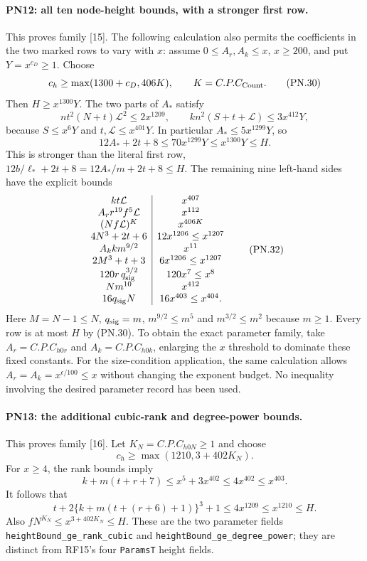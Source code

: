 \paragraph{PN12: all ten node-height bounds, with a stronger first row.}
This proves family [15]. The following calculation also permits the
coefficients in the two marked rows to vary with $x$: assume
$0\leq A_r,A_k\leq x$, $x\geq200$, and put $Y=x^{c_D}\geq1$.
Choose
\[
                  c_h\geq\max(1300+c_D,406K),
                  \qquad K=C.P.C_{\rm Count}.                \tag{PN.30}
\]
Then $H\geq x^{1300}Y$. The two parts of $A_*$ satisfy
\[
 nt^2(N+t)\mathcal L^2\leq2x^{1209},\qquad
 kn^2(S+t+\mathcal L)\leq3x^{412}Y,
\]
because $S\leq x^6Y$ and $t,\mathcal L\leq x^{401}Y$.
In particular $A_*\leq5x^{1299}Y$, so
\[
 12A_*+2t+8\leq70x^{1299}Y\leq x^{1300}Y\leq H.
                                                               \tag{PN.31}
\]
This is stronger than the literal first row,
$12b/\ell_*+2t+8=12A_*/m+2t+8\leq H$.
The remaining nine left-hand sides have the explicit bounds
\[
\begin{array}{c|c}
 kt\mathcal L&x^{407}\\
 A_r r^{19}f^5\mathcal L&x^{112}\\
 (Nf\mathcal L)^K&x^{406K}\\
 4N^3+2t+6&12x^{1206}\leq x^{1207}\\
 A_k k m^{9/2}&x^{11}\\
 2M^3+t+3&6x^{1206}\leq x^{1207}\\
 120r\,q_{\rm sig}^{3/2}&120x^7\leq x^8\\
 Nm^{10}&x^{412}\\
 16q_{\rm sig}N&16x^{403}\leq x^{404}.
\end{array}                                                   \tag{PN.32}
\]
Here $M=N-1\leq N$, $q_{\rm sig}=m$,
$m^{9/2}\leq m^5$ and $m^{3/2}\leq m^2$ because $m\geq1$.
Every row is at most $H$ by (PN.30). To obtain the exact parameter
family, take $A_r=C.P.C_{h0r}$ and $A_k=C.P.C_{h0k}$, enlarging the
$x$ threshold to dominate these fixed constants. For the size-condition
application, the same calculation allows
$A_r=A_k=x^{\epsilon/100}\leq x$ without changing the exponent budget.
No inequality involving the desired parameter record has been used.

\paragraph{PN13: the additional cubic-rank and degree-power bounds.}
This proves family [16]. Let $K_N=C.P.C_{h0N}\geq1$ and choose
\[
                   c_h\geq\max(1210,3+402K_N).
                                                               \tag{PN.33}
\]
For $x\geq4$, the rank bounds imply
\[
 k+m(t+r+7)\leq x^5+3x^{402}\leq4x^{402}\leq x^{403}.
\]
It follows that
\[
 t+2\{k+m(t+(r+6)+1)\}^3+1
       \leq4x^{1209}\leq x^{1210}\leq H.                   \tag{PN.34}
\]
Also $fN^{K_N}\leq x^{3+402K_N}\leq H$.
These are the two parameter fields
\texttt{heightBound\_ge\_rank\_cubic} and
\texttt{heightBound\_ge\_degree\_power}; they are distinct from
RF15's four \texttt{ParamsT} height fields.

